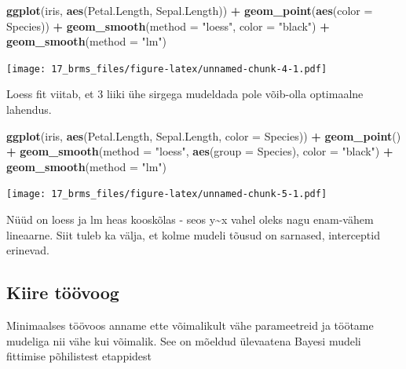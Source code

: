 \documentclass[]{book}
\newenvironment{Shaded}{\begin{snugshade}}{\end{snugshade}}
\newcommand{\DataTypeTok}[1]{\textcolor[rgb]{0.13,0.29,0.53}{#1}}
\newcommand{\KeywordTok}[1]{\textcolor[rgb]{0.13,0.29,0.53}{\textbf{#1}}}
\newcommand{\NormalTok}[1]{#1}
\newcommand{\OperatorTok}[1]{\textcolor[rgb]{0.81,0.36,0.00}{\textbf{#1}}}
\newcommand{\StringTok}[1]{\textcolor[rgb]{0.31,0.60,0.02}{#1}}
\begin{document}
\begin{Shaded}
\begin{Highlighting}[]
\KeywordTok{ggplot}\NormalTok{(iris, }\KeywordTok{aes}\NormalTok{(Petal.Length, Sepal.Length)) }\OperatorTok{+}\StringTok{ }
\StringTok{  }\KeywordTok{geom_point}\NormalTok{(}\KeywordTok{aes}\NormalTok{(}\DataTypeTok{color =}\NormalTok{ Species)) }\OperatorTok{+}
\StringTok{  }\KeywordTok{geom_smooth}\NormalTok{(}\DataTypeTok{method =} \StringTok{"loess"}\NormalTok{, }\DataTypeTok{color =} \StringTok{"black"}\NormalTok{) }\OperatorTok{+}
\StringTok{  }\KeywordTok{geom_smooth}\NormalTok{(}\DataTypeTok{method =} \StringTok{"lm"}\NormalTok{)}
\end{Highlighting}
\end{Shaded}

\texttt{[image: 17\_brms\_files/figure-latex/unnamed-chunk-4-1.pdf]}

Loess fit viitab, et 3 liiki ühe sirgega mudeldada pole võib-olla optimaalne lahendus.

\begin{Shaded}
\begin{Highlighting}[]
\KeywordTok{ggplot}\NormalTok{(iris, }\KeywordTok{aes}\NormalTok{(Petal.Length, Sepal.Length, }\DataTypeTok{color =}\NormalTok{ Species)) }\OperatorTok{+}\StringTok{ }
\StringTok{  }\KeywordTok{geom_point}\NormalTok{() }\OperatorTok{+}
\StringTok{  }\KeywordTok{geom_smooth}\NormalTok{(}\DataTypeTok{method =} \StringTok{"loess"}\NormalTok{, }\KeywordTok{aes}\NormalTok{(}\DataTypeTok{group =}\NormalTok{ Species), }\DataTypeTok{color =} \StringTok{"black"}\NormalTok{) }\OperatorTok{+}
\StringTok{  }\KeywordTok{geom_smooth}\NormalTok{(}\DataTypeTok{method =} \StringTok{"lm"}\NormalTok{)}
\end{Highlighting}
\end{Shaded}

\texttt{[image: 17\_brms\_files/figure-latex/unnamed-chunk-5-1.pdf]}

Nüüd on loess ja lm heas kooskõlas - seos y\textasciitilde{}x vahel oleks nagu enam-vähem lineaarne. Siit tuleb ka välja, et kolme mudeli tõusud on sarnased, interceptid erinevad.

\hypertarget{kiire-toovoog}{%
\subsection{Kiire töövoog}\label{kiire-toovoog}}

Minimaalses töövoos anname ette võimalikult vähe parameetreid ja töötame mudeliga nii vähe kui võimalik. See on mõeldud ülevaatena Bayesi mudeli fittimise põhilistest etappidest
\end{document}
